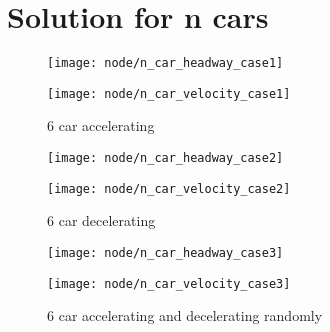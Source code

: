 	\section{Solution for n cars}
		\begin{figure}[ht]
			\centering
			\begin{minipage}{.5\textwidth}
				\centering
				\texttt{[image: node/n\_car\_headway\_case1]}
			\end{minipage}\hfill
			\begin{minipage}{.5\textwidth}
				\centering
				\texttt{[image: node/n\_car\_velocity\_case1]}
			\end{minipage}
			\caption{6 car accelerating}
			\label{fig:node_case1}
		\end{figure}
		\begin{figure}[ht]
			\centering
			\begin{minipage}{.5\textwidth}
				\centering
				\texttt{[image: node/n\_car\_headway\_case2]}
			\end{minipage}\hfill
			\begin{minipage}{.5\textwidth}
				\centering
				\texttt{[image: node/n\_car\_velocity\_case2]}
			\end{minipage}
			\caption{6 car decelerating}
			\label{fig:node_case2}
		\end{figure}
		\begin{figure}[ht]
			\centering
			\begin{minipage}{.5\textwidth}
				\centering
				\texttt{[image: node/n\_car\_headway\_case3]}
			\end{minipage}\hfill
			\begin{minipage}{.5\textwidth}
				\centering
				\texttt{[image: node/n\_car\_velocity\_case3]}
			\end{minipage}
			\caption{6 car accelerating and decelerating randomly}
			\label{fig:node_case3}
		\end{figure}